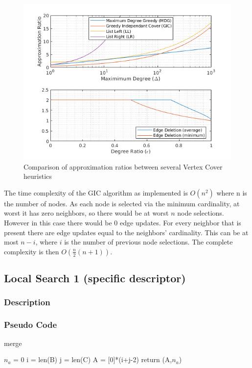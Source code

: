 \documentclass[acmlarge]{acmart}
\begin{document}
\begin{figure}[h]
	\centering
	\includegraphics[width=0.8\linewidth]{ApproxRatioComp.png}
	\caption{Comparison of approximation ratios between several Vertex Cover heuristics}
	\label{fig:approx_comp}
\end{figure}



The time complexity of the GIC algorithm as implemented is $O(n^2)$ where n is the number of nodes. As each node is selected via the minimum cardinality, at worst it has zero neighbors, so there would be at worst $n$ node selections. However in this case there would be 0 edge updates. For every neighbor that is present there are edge updates equal to the neighbors' cardinality. This can be at most $n-i$, where $i$ is the number of previous node selections. The complete complexity is then $O(\frac{n}{2}(n+1))$.

\subsection{Local Search 1 (specific descriptor)}

\subsubsection{Description}

\lipsum[1]

\subsubsection{Pseudo Code}

\begin{algorithm}[H]
	\caption{merge}
	\SetAlgoLined
	$n_a$ = 0\;
	i = len(B)\;
	j = len(C)\;
	A = [0]*(i+j-2)\;
	return (A,$n_a$)
\end{algorithm}
\end{document}
